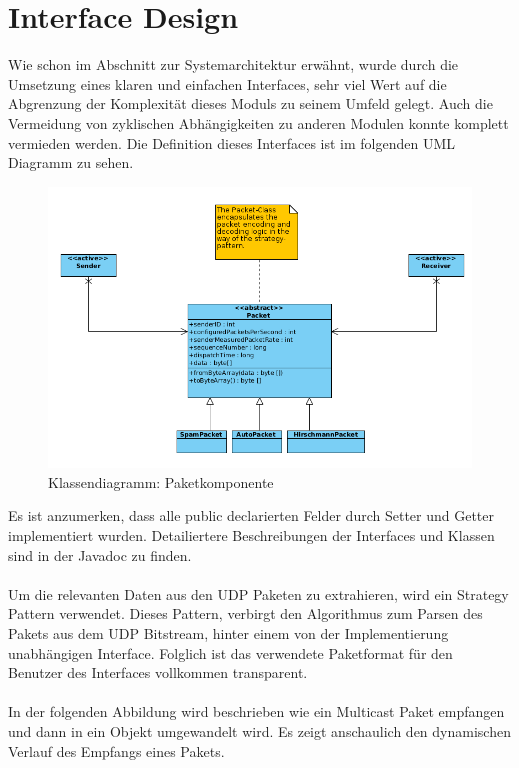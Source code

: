 %
%


\section{Interface Design}
\label{sec:7:packet}

Wie schon im Abschnitt zur Systemarchitektur erwähnt, wurde durch die Umsetzung eines klaren und einfachen Interfaces, sehr viel Wert auf die Abgrenzung der Komplexität dieses Moduls zu seinem Umfeld gelegt. Auch die Vermeidung von zyklischen Abhängigkeiten zu anderen Modulen konnte komplett vermieden werden. Die Definition dieses Interfaces ist im folgenden UML Diagramm zu sehen.

\label{sec:4:empf}
\begin{figure}[H]
\includegraphics[width=15cm]{images/Package.png}
\centering
\caption{Klassendiagramm: Paketkomponente}
\label{uml_controller}
\end{figure}

Es ist anzumerken, dass alle public declarierten Felder durch Setter und Getter implementiert wurden.
Detailiertere Beschreibungen der Interfaces und Klassen sind in der Javadoc zu finden.
\\\\
Um die relevanten Daten aus den UDP Paketen zu extrahieren, wird ein Strategy Pattern verwendet.
Dieses Pattern, verbirgt den Algorithmus zum Parsen des Pakets aus dem UDP Bitstream, hinter einem von der
Implementierung unabhängigen Interface. Folglich ist das verwendete Paketformat für 
den Benutzer des Interfaces vollkommen transparent.
\\\\
In der folgenden Abbildung wird beschrieben wie ein Multicast Paket empfangen und
dann in ein Objekt umgewandelt wird. Es zeigt anschaulich den dynamischen Verlauf des Empfangs eines Pakets.

